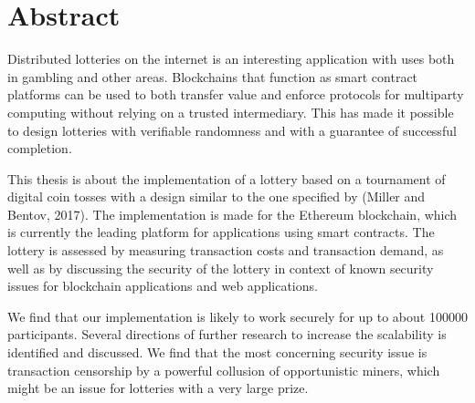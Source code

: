 \chapter*{Abstract}

\begin{center}
Distributed lotteries on the internet is an interesting application with uses both in gambling and other areas. Blockchains that function as smart contract platforms can be used to both transfer value and enforce protocols for multiparty computing without relying on a trusted intermediary. This has made it possible to design lotteries with verifiable randomness and with a guarantee of successful completion. 

This thesis is about the implementation of a lottery based on a tournament of digital coin tosses with a design similar to the one specified by (Miller and Bentov, 2017). The implementation is made for the Ethereum blockchain, which is currently the leading platform for applications using smart contracts. The lottery is assessed by measuring transaction costs and transaction demand, as well as by discussing the security of the lottery in context of known security issues for blockchain applications and web applications.

We find that our implementation is likely to work securely for up to about 100000 participants. Several directions of further research to increase the scalability is identified and discussed. We find that the most concerning security issue is transaction censorship by a powerful collusion of opportunistic miners, which might be an issue for lotteries with a very large prize.
\end{center}

\hypersetup{pageanchor=false}